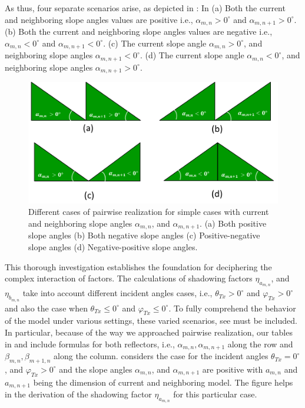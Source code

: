 As thus, four separate scenarios arise, as depicted in : In (a) Both the current and neighboring slope angles  values are positive i.e., $\alpha_{m,n}>0^\circ$ and $\alpha_{m,n+1}>0^\circ$. (b) Both the current and neighboring slope angles values are negative i.e., $\alpha_{m,n}<0^\circ$ and $\alpha_{m,n+1}<0^\circ$. (c) The current slope angle $\alpha_{m,n}>0^\circ$, and neighboring slope angles $\alpha_{m,n+1}<0^\circ$. (d) The current slope angle $\alpha_{m,n}<0^\circ$, and neighboring slope angles $\alpha_{m,n+1}>0^\circ$.
\begin{figure}[H]
	\centering
	\includegraphics[width=0.85\linewidth]{images/Section 3 Images/ShadowRegion2}
	\caption{Different cases of pairwise realization for simple cases with current and neighboring slope angles $\alpha_{m,n}$, and $\alpha_{m,n+1}$. (a) Both positive slope angles (b) Both negative slope angles (c) Positive-negative slope angles (d) Negative-positive slope angles.}
	\label{fig:Shadow region1}
\end{figure}
This thorough investigation establishes the foundation for deciphering the complex interaction of factors. The calculations of shadowing factors $\eta_{a_{m,n}}$, and $\eta_{b_{m,n}}$ take into account different incident angles cases, i.e., $\theta_{Tx} > \num{0}^\circ $ and $\varphi_{Tx} > \num{0}^\circ$ and also the case when $\theta_{Tx} \leq \num{0}^\circ $ and $\varphi_{Tx} \leq \num{0}^\circ$. To fully comprehend the behavior of the model under various settings, these varied scenarios, see  must be included. In particular, because of the way we approached pairwise realization, our tables in  and  include formulas for both reflectors, i.e., $\alpha_{m,n}, \alpha_{m,n+1}$ along the row and $\beta_{m,n}, \beta_{m+1,n}$ along the column.  considers the case for the incident angles $\theta_{Tx}=\num{0}^\circ$, and $\varphi_{Tx}>\num{0}^\circ$ and the slope angles $\alpha_{m,n}$, and $\alpha_{m,n+1}$ are positive with $a_{m,n}$ and $a_{m,n+1}$ being the dimension of current and neighboring model. The figure helps in the derivation of the shadowing factor $\eta_{a_{m,n}}$ for this particular case. 

